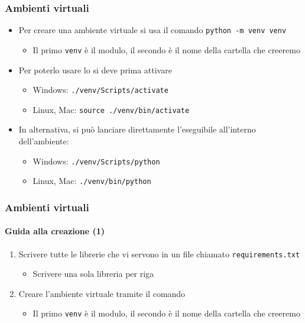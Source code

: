 \begin{contentframe}
    \frametitle{Ambienti virtuali}

    \begin{itemize}
        \item Per creare una ambiente virtuale si usa il comando \texttt{python -m venv venv}
        \begin{itemize}
            \item Il primo \texttt{venv} è il modulo, il secondo è il nome della cartella che creeremo
        \end{itemize}

        \bigskip
        \item Per poterlo usare lo si deve prima attivare
        \begin{itemize}
            \item Windows: \texttt{./venv/Scripts/activate}
            \item Linux, Mac: \texttt{source ./venv/bin/activate}
        \end{itemize}

        \bigskip
        \item In alternativa, si può lanciare direttamente l'eseguibile all'interno dell'ambiente:
        \begin{itemize}
            \item Windows: \texttt{./venv/Scripts/python}
            \item Linux, Mac: \texttt{./venv/bin/python}
        \end{itemize}
    \end{itemize}
\end{contentframe}

\begin{exampleframe}
    \frametitle{Ambienti virtuali}
    \framesubtitle{Guida alla creazione (1)}

    \begin{enumerate}
        \item Scrivere tutte le librerie che vi servono in un file chiamato \texttt{requirements.txt}
        \begin{itemize}
            \item Scrivere una sola libreria per riga
        \end{itemize}

        \bigskip
        \item Creare l'ambiente virtuale tramite il comando 
        \begin{itemize}
            \item Il primo \texttt{venv} è il modulo, il secondo è il nome della cartella che creeremo
        \end{itemize}
    \end{enumerate}
\end{exampleframe}

